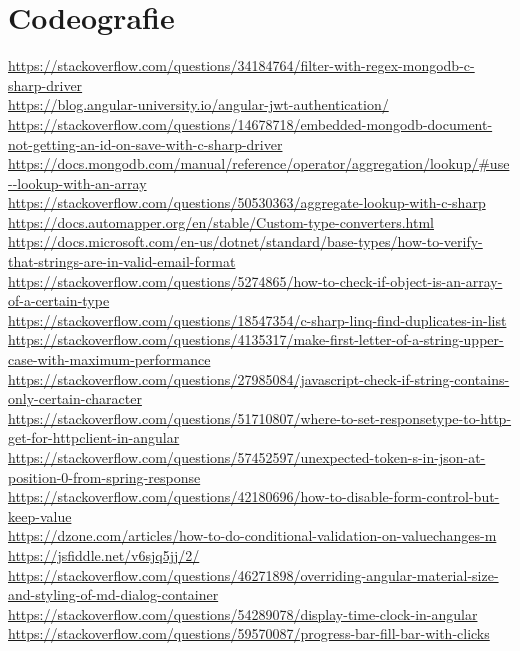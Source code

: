 \section{Codeografie}
\url{https://stackoverflow.com/questions/34184764/filter-with-regex-mongodb-c-sharp-driver}\\
\url{https://blog.angular-university.io/angular-jwt-authentication/}\\
\url{https://stackoverflow.com/questions/14678718/embedded-mongodb-document-not-getting-an-id-on-save-with-c-sharp-driver}\\
\url{https://docs.mongodb.com/manual/reference/operator/aggregation/lookup/\#use--lookup-with-an-array}\\
\url{https://stackoverflow.com/questions/50530363/aggregate-lookup-with-c-sharp}\\
\url{https://docs.automapper.org/en/stable/Custom-type-converters.html}\\
\url{https://docs.microsoft.com/en-us/dotnet/standard/base-types/how-to-verify-that-strings-are-in-valid-email-format}\\
\url{https://stackoverflow.com/questions/5274865/how-to-check-if-object-is-an-array-of-a-certain-type}\\
\url{https://stackoverflow.com/questions/18547354/c-sharp-linq-find-duplicates-in-list}\\
\url{https://stackoverflow.com/questions/4135317/make-first-letter-of-a-string-upper-case-with-maximum-performance}\\
\url{https://stackoverflow.com/questions/27985084/javascript-check-if-string-contains-only-certain-character}\\
\url{https://stackoverflow.com/questions/51710807/where-to-set-responsetype-to-http-get-for-httpclient-in-angular}\\
\url{https://stackoverflow.com/questions/57452597/unexpected-token-s-in-json-at-position-0-from-spring-response}\\
\url{https://stackoverflow.com/questions/42180696/how-to-disable-form-control-but-keep-value}\\
\url{https://dzone.com/articles/how-to-do-conditional-validation-on-valuechanges-m}\\
\url{https://jsfiddle.net/v6sjq5jj/2/}\\
\url{https://stackoverflow.com/questions/46271898/overriding-angular-material-size-and-styling-of-md-dialog-container}\\
\url{https://stackoverflow.com/questions/54289078/display-time-clock-in-angular}\\
\url{https://stackoverflow.com/questions/59570087/progress-bar-fill-bar-with-clicks}\\